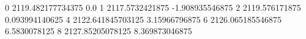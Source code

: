0 2119.482177734375 0.0
1 2117.5732421875 -1.908935546875
2 2119.576171875 0.093994140625
4 2122.641845703125 3.15966796875
6 2126.065185546875 6.5830078125
8 2127.85205078125 8.369873046875
